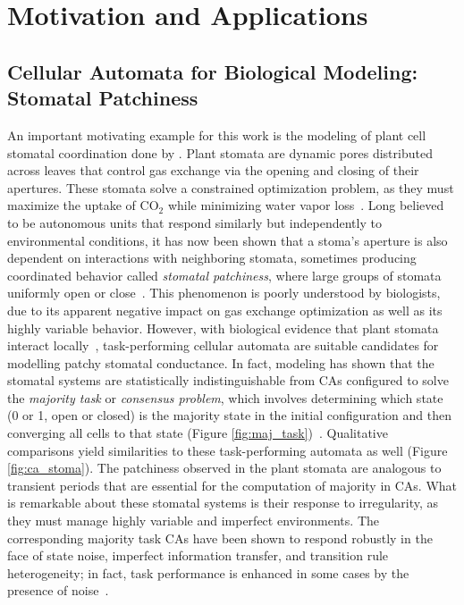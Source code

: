 \documentclass[a4paper,11pt,twoside]{report}
\begin{document}
\section{Motivation and Applications}
\label{sec:Motiv}
\subsection{Cellular Automata for Biological Modeling: Stomatal Patchiness}
\label{subsec:Stoma}
An important motivating example for this work is the modeling of plant cell stomatal coordination done by \citeauthor{pe04}. Plant stomata are dynamic pores distributed across leaves that control gas exchange via the opening and closing of their apertures. These stomata solve a constrained optimization problem, as they must maximize the uptake of CO$_\text{2}$ while minimizing water vapor loss~\cite{mo07,we11}. Long believed to be autonomous units that respond similarly but independently to environmental conditions, it has now been shown that a stoma's aperture is also dependent on interactions with neighboring stomata, sometimes producing coordinated behavior called \textit{stomatal patchiness}, where large groups of stomata uniformly open or close~\cite{pe04}. This phenomenon is poorly understood by biologists, due to its apparent negative impact on gas exchange optimization as well as its highly variable behavior. However, with biological evidence that plant stomata interact locally~\cite{pe04}, task-performing cellular automata are suitable candidates for modelling patchy stomatal conductance. In fact, modeling has shown that the stomatal systems are statistically indistinguishable from CAs configured to solve the \textit{majority task} or \textit{consensus problem}, which involves determining which state (0 or 1, open or closed) is the majority state in the initial configuration and then converging all cells to that state (Figure \ref{fig:maj_task})~\cite{gr15}. Qualitative comparisons yield similarities to these task-performing automata as well (Figure \ref{fig:ca_stoma}). The patchiness observed in the plant stomata are analogous to transient periods that are essential for the computation of majority in CAs. What is remarkable about these stomatal systems is their response to irregularity, as they must manage highly variable and imperfect environments. The corresponding majority task CAs have been shown to respond robustly in the face of state noise, imperfect information transfer, and transition rule heterogeneity; in fact, task performance is enhanced in some cases by the presence of noise~\cite{me07}.
\end{document}
